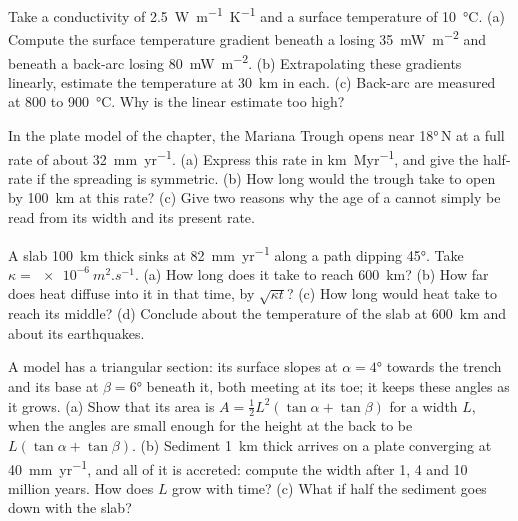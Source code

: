 \begin{exercise}[$\star\star$]\label{exo:b1:active-margins:8}
Take a conductivity of \qty{2.5}{W.m^{-1}.K^{-1}} and a surface temperature
of \qty{10}{\celsius}. (a) Compute the surface temperature gradient beneath a
 losing \qty{35}{mW.m^{-2}} and beneath a back-arc losing
\qty{80}{mW.m^{-2}}. (b) Extrapolating these gradients linearly, estimate the
temperature at \qty{30}{km} in each. (c) Back-arc  are measured at 800 to
\qty{900}{\celsius}. Why is the linear estimate too high?
\end{exercise}

\begin{exercise}[$\star\star$]\label{exo:b1:active-margins:9}
In the plate model of the chapter, the Mariana Trough opens near \ang{18}\,N at
a full rate of about \qty{32}{mm.yr^{-1}}. (a) Express this rate in
\unit{km.Myr^{-1}}, and give the half-rate if the spreading is symmetric.
(b) How long would the trough take to open by \qty{100}{km} at this rate?
(c) Give two reasons why the age of a  cannot simply be read
from its width and its present rate.
\end{exercise}

\begin{exercise}[$\star\star\star$]\label{exo:b1:active-margins:10}
A slab \qty{100}{km} thick sinks at \qty{82}{mm.yr^{-1}} along a path dipping
\ang{45}. Take $\kappa = \qty{e-6}{m^2.s^{-1}}$. (a) How long does it take to
reach \qty{600}{km}? (b) How far does heat diffuse into it in that time, by
$\sqrt{\kappa t}$? (c) How long would heat take to reach its middle? (d)
Conclude about the temperature of the slab at \qty{600}{km} and about its
earthquakes.
\end{exercise}

\begin{exercise}[$\star\star\star$]\label{exo:b1:active-margins:11}
A model  has a triangular section: its surface slopes at
$\alpha = \ang{4}$ towards the trench and its base  at $\beta = \ang{6}$
beneath it, both meeting at its toe; it keeps these angles as it grows. (a)
Show that its area is $A = \frac12 L^2(\tan\alpha + \tan\beta)$ for a width
$L$, when the angles are small enough for the height at the back to be
$L(\tan\alpha + \tan\beta)$. (b) Sediment \qty{1}{km} thick arrives on a plate
converging at \qty{40}{mm.yr^{-1}}, and all of it is accreted: compute the
width after 1, 4 and 10 million years. How does $L$ grow with time? (c) What
if half the sediment goes down with the slab?
\end{exercise}

